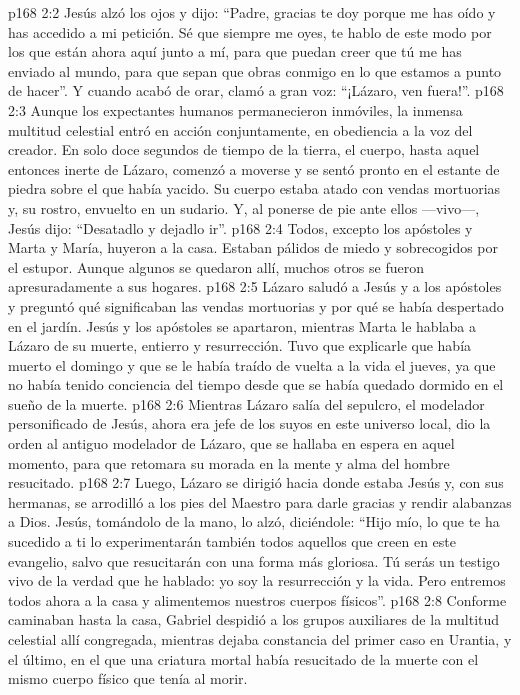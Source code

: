 \vs p168 2:2 Jesús alzó los ojos y dijo: “Padre, gracias te doy porque me has oído y has accedido a mi petición. Sé que siempre me oyes, te hablo de este modo por los que están ahora aquí junto a mí, para que puedan creer que tú me has enviado al mundo, para que sepan que obras conmigo en lo que estamos a punto de hacer”. Y cuando acabó de orar, clamó a gran voz: “¡Lázaro, ven fuera!”.
\vs p168 2:3 Aunque los expectantes humanos permanecieron inmóviles, la inmensa multitud celestial entró en acción conjuntamente, en obediencia a la voz del creador. En solo doce segundos de tiempo de la tierra, el cuerpo, hasta aquel entonces inerte de Lázaro, comenzó a moverse y se sentó pronto en el estante de piedra sobre el que había yacido. Su cuerpo estaba atado con vendas mortuorias y, su rostro, envuelto en un sudario. Y, al ponerse de pie ante ellos ---vivo---, Jesús dijo: “Desatadlo y dejadlo ir”.
\vs p168 2:4 Todos, excepto los apóstoles y Marta y María, huyeron a la casa. Estaban pálidos de miedo y sobrecogidos por el estupor. Aunque algunos se quedaron allí, muchos otros se fueron apresuradamente a sus hogares.
\vs p168 2:5 Lázaro saludó a Jesús y a los apóstoles y preguntó qué significaban las vendas mortuorias y por qué se había despertado en el jardín. Jesús y los apóstoles se apartaron, mientras Marta le hablaba a Lázaro de su muerte, entierro y resurrección. Tuvo que explicarle que había muerto el domingo y que se le había traído de vuelta a la vida el jueves, ya que no había tenido conciencia del tiempo desde que se había quedado dormido en el sueño de la muerte.
\vs p168 2:6 \pc Mientras Lázaro salía del sepulcro, el modelador personificado de Jesús, ahora era jefe de los suyos en este universo local, dio la orden al antiguo modelador de Lázaro, que se hallaba en espera en aquel momento, para que retomara su morada en la mente y alma del hombre resucitado.
\vs p168 2:7 \pc Luego, Lázaro se dirigió hacia donde estaba Jesús y, con sus hermanas, se arrodilló a los pies del Maestro para darle gracias y rendir alabanzas a Dios. Jesús, tomándolo de la mano, lo alzó, diciéndole: “Hijo mío, lo que te ha sucedido a ti lo experimentarán también todos aquellos que creen en este evangelio, salvo que resucitarán con una forma más gloriosa. Tú serás un testigo vivo de la verdad que he hablado: yo soy la resurrección y la vida. Pero entremos todos ahora a la casa y alimentemos nuestros cuerpos físicos”.
\vs p168 2:8 \pc Conforme caminaban hasta la casa, Gabriel despidió a los grupos auxiliares de la multitud celestial allí congregada, mientras dejaba constancia del primer caso en Urantia, y el último, en el que una criatura mortal había resucitado de la muerte con el mismo cuerpo físico que tenía al morir.
